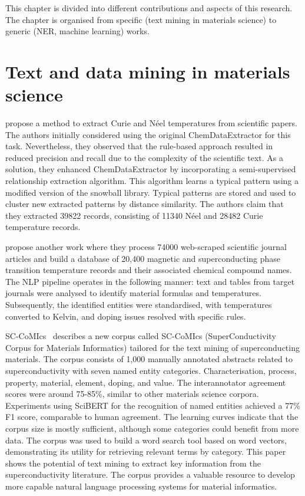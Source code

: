
This chapter is divided into different contributions and aspects of this research.
The chapter is organised from specific (text mining in materials science) to generic (NER, machine learning) works.

\section{Text and data mining in materials science}

\cite{court2018auto} propose a method to extract Curie and Néel temperatures from scientific papers. 
The authors initially considered using the original ChemDataExtractor for this task. 
Nevertheless, they observed that the rule-based approach resulted in reduced precision and recall due to the complexity of the scientific text. As a solution, they enhanced ChemDataExtractor by incorporating a semi-supervised relationship extraction algorithm.
This algorithm learns a typical pattern using a modified version of the snowball library. Typical patterns are stored and used to cluster new extracted patterns by distance similarity. 
The authors claim that they extracted 39822 records, consisting of 11340 Néel and 28482 Curie temperature records. 

\cite{court2020magnetic} propose another work where they process 74000 web-scraped scientific journal articles and build a database of 20,400 magnetic and superconducting phase transition temperature records and their associated chemical compound names.
The NLP pipeline operates in the following manner: text and tables from target journals were analysed to identify material formulas and temperatures. Subsequently, the identified entities were standardised, with temperatures converted to Kelvin, and doping issues resolved with specific rules.



SC-CoMIcs~\cite{yamaguchi-etal-2020-sc} describes a new corpus called SC-CoMIcs (SuperConductivity Corpus for Materials Informatics) tailored for the text mining of superconducting materials.
The corpus consists of 1,000 manually annotated abstracts related to superconductivity with seven named entity categories. Characterisation, process, property, material, element, doping, and value. The interannotator agreement scores were around 75-85\%, similar to other materials science corpora.
Experiments using SciBERT for the recognition of named entities achieved a 77\% F1 score, comparable to human agreement.
The learning curves indicate that the corpus size is mostly sufficient, although some categories could benefit from more data. The corpus was used to build a word search tool based on word vectors, demonstrating its utility for retrieving relevant terms by category. This paper shows the potential of text mining to extract key information from the superconductivity literature. The corpus provides a valuable resource to develop more capable natural language processing systems for material informatics.  

